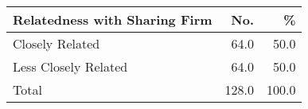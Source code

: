 \documentclass{article}
\begin{document}
\begin{tabular}{lrr}
\hline
Relatedness with Sharing Firm&No.&\% \\
\hline
Closely Related&64.0&50.0 \\
Less Closely Related&64.0&50.0 \\
Total&128.0&100.0 \\
\hline
\end{tabular}
\end{document}
